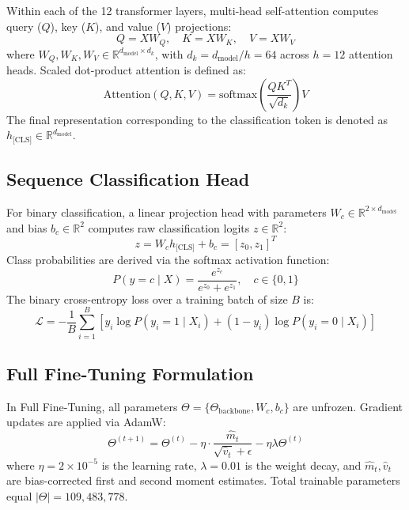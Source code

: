 \documentclass[conference]{IEEEtran}
\begin{document}
Within each of the 12 transformer layers, multi-head self-attention computes query ($Q$), key ($K$), and value ($V$) projections:
\begin{equation}
Q = X W_Q, \quad K = X W_K, \quad V = X W_V
\end{equation}
where $W_Q, W_K, W_V \in \mathbb{R}^{d_{\text{model}} \times d_k}$, with $d_k = d_{\text{model}} / h = 64$ across $h = 12$ attention heads. Scaled dot-product attention is defined as:
\begin{equation}
\text{Attention}(Q, K, V) = \text{softmax}\left(\frac{Q K^T}{\sqrt{d_k}}\right) V
\end{equation}
The final representation corresponding to the classification token is denoted as $h_{\text{[CLS]}} \in \mathbb{R}^{d_{\text{model}}}$.

\subsection{Sequence Classification Head}
For binary classification, a linear projection head with parameters $W_c \in \mathbb{R}^{2 \times d_{\text{model}}}$ and bias $b_c \in \mathbb{R}^2$ computes raw classification logits $z \in \mathbb{R}^2$:
\begin{equation}
z = W_c h_{\text{[CLS]}} + b_c = [z_0, z_1]^T
\end{equation}
Class probabilities are derived via the softmax activation function:
\begin{equation}
P(y = c \mid X) = \frac{e^{z_c}}{e^{z_0} + e^{z_1}}, \quad c \in \{0, 1\}
\end{equation}
The binary cross-entropy loss over a training batch of size $B$ is:
\begin{equation}
\mathcal{L} = -\frac{1}{B} \sum_{i=1}^B \left[ y_i \log P(y_i = 1 \mid X_i) + (1 - y_i) \log P(y_i = 0 \mid X_i) \right]
\end{equation}

\subsection{Full Fine-Tuning Formulation}
In Full Fine-Tuning, all parameters $\Theta = \{\Theta_{\text{backbone}}, W_c, b_c\}$ are unfrozen. Gradient updates are applied via AdamW:
\begin{equation}
\Theta^{(t+1)} = \Theta^{(t)} - \eta \cdot \frac{\hat{m}_t}{\sqrt{\hat{v}_t} + \epsilon} - \eta \lambda \Theta^{(t)}
\end{equation}
where $\eta = 2\times 10^{-5}$ is the learning rate, $\lambda = 0.01$ is the weight decay, and $\hat{m}_t, \hat{v}_t$ are bias-corrected first and second moment estimates. Total trainable parameters equal $|\Theta| = 109,483,778$.
\end{document}
